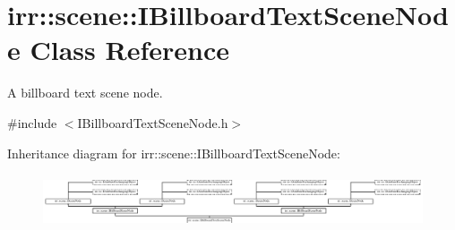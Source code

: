\hypertarget{classirr_1_1scene_1_1IBillboardTextSceneNode}{}\section{irr\+:\+:scene\+:\+:I\+Billboard\+Text\+Scene\+Node Class Reference}
\label{classirr_1_1scene_1_1IBillboardTextSceneNode}


A billboard text scene node.  




{\ttfamily \#include $<$I\+Billboard\+Text\+Scene\+Node.\+h$>$}

Inheritance diagram for irr\+:\+:scene\+:\+:I\+Billboard\+Text\+Scene\+Node\+:\begin{figure}[H]
\begin{center}
\leavevmode
\includegraphics[height=1.583710cm]{classirr_1_1scene_1_1IBillboardTextSceneNode}
\end{center}
\end{figure}
